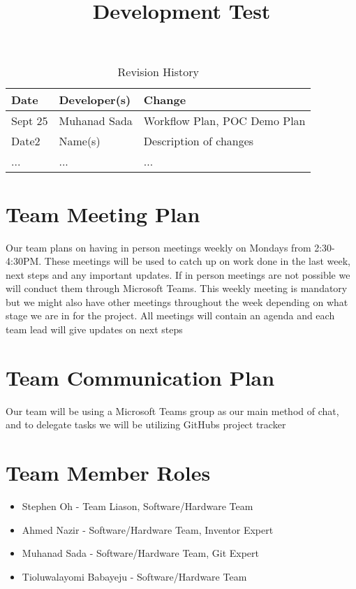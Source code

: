 \documentclass{article}
\title{Development Test\\\progname}
\author{\authname}
\date{}
\begin{document}
\begin{table}[hp]
\caption{Revision History} \label{TblRevisionHistory}
\begin{tabularx}{\textwidth}{llX}
\toprule
\textbf{Date} & \textbf{Developer(s)} & \textbf{Change}\\
\midrule
Sept 25 & Muhanad Sada & Workflow Plan, POC Demo Plan\\
Date2 & Name(s) & Description of changes\\
... & ... & ...\\
\bottomrule
\end{tabularx}
\end{table}

\newpage

\maketitle


\section{Team Meeting Plan}
Our team plans on having in person meetings weekly on Mondays from 2:30-4:30PM. These meetings will be used to catch up on work done in the last week, next steps and any important updates. If in person meetings are not possible we will conduct them through Microsoft Teams. This weekly meeting is mandatory but we might also have other meetings throughout the week depending on what stage we are in for the project. All meetings will contain an agenda and each team lead will give updates on next steps 

\section{Team Communication Plan}
Our team will be using a Microsoft Teams group as our main method of chat, and to delegate tasks we will be utilizing GitHubs project tracker

\section{Team Member Roles}
\begin{itemize}
	\item Stephen Oh - Team Liason, Software/Hardware Team
	\item Ahmed Nazir - Software/Hardware Team, Inventor Expert
	\item Muhanad Sada - Software/Hardware Team, Git Expert
	\item Tioluwalayomi Babayeju - Software/Hardware Team
\end{itemize}
\end{document}
